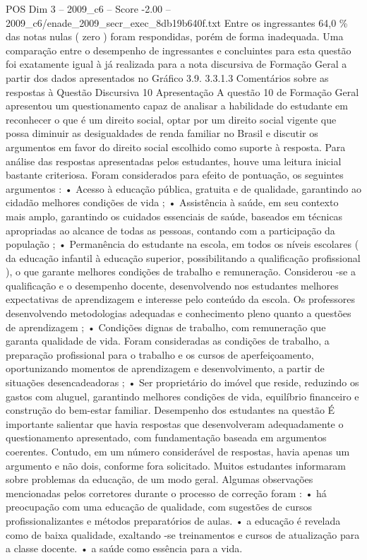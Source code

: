 \begin{textsample}{POS Dim 3 – 2009\_c6 – Score -2.00 – 2009\_c6/enade\_2009\_secr\_exec\_8db19b640f.txt}
Entre os ingressantes 64,0 \% das notas nulas ( zero ) foram respondidas, porém de forma inadequada.
Uma comparação entre o desempenho de ingressantes e concluintes para esta questão foi exatamente igual à já realizada para a nota discursiva de Formação Geral a partir dos dados apresentados no Gráfico 3.9. 3.3.1.3 Comentários sobre as respostas à Questão Discursiva 10 Apresentação A questão 10 de Formação Geral apresentou um questionamento capaz de analisar a habilidade do estudante em reconhecer o que é um direito social, optar por um direito social vigente que possa diminuir as desigualdades de renda familiar no Brasil e discutir os argumentos em favor do direito social escolhido como suporte à resposta.
Para análise das respostas apresentadas pelos estudantes, houve uma leitura inicial bastante criteriosa.
Foram considerados para efeito de pontuação, os seguintes argumentos : • Acesso à educação pública, gratuita e de qualidade, garantindo ao cidadão melhores condições de vida ; • Assistência à saúde, em seu contexto mais amplo, garantindo os cuidados essenciais de saúde, baseados em técnicas apropriadas ao alcance de todas as pessoas, contando com a participação da população ; • Permanência do estudante na escola, em todos os níveis escolares ( da educação infantil à educação superior, possibilitando a qualificação profissional ), o que garante melhores condições de trabalho e remuneração.
Considerou -se a qualificação e o desempenho docente, desenvolvendo nos estudantes melhores expectativas de aprendizagem e interesse pelo conteúdo da escola.
Os professores desenvolvendo metodologias adequadas e conhecimento pleno quanto a questões de aprendizagem ; • Condições dignas de trabalho, com remuneração que garanta qualidade de vida.
Foram consideradas as condições de trabalho, a preparação profissional para o trabalho e os cursos de aperfeiçoamento, oportunizando momentos de aprendizagem e desenvolvimento, a partir de situações desencadeadoras ; • Ser proprietário do imóvel que reside, reduzindo os gastos com aluguel, garantindo melhores condições de vida, equilíbrio financeiro e construção do bem-estar familiar.
Desempenho dos estudantes na questão É importante salientar que havia respostas que desenvolveram adequadamente o questionamento apresentado, com fundamentação baseada em argumentos coerentes.
Contudo, em um número considerável de respostas, havia apenas um argumento e não dois, conforme fora solicitado.
Muitos estudantes informaram sobre problemas da educação, de um modo geral.
Algumas observações mencionadas pelos corretores durante o processo de correção foram : • há preocupação com uma educação de qualidade, com sugestões de cursos profissionalizantes e métodos preparatórios de aulas. • a educação é revelada como de baixa qualidade, exaltando -se treinamentos e cursos de atualização para a classe docente. • a saúde como essência para a vida.

\end{textsample}

